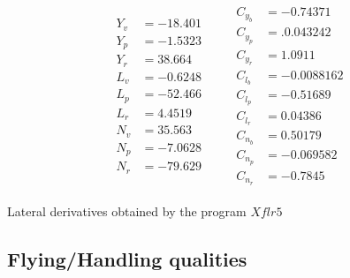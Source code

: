 \documentclass[english,fira]{ist-report}
\begin{document}
\begin{table}[ht]
    \centering
    \begin{gather*}
        \begin{aligned}
            Y_v &= -18.401 \\
            Y_p &= -1.5323 \\
            Y_r &=  38.664 \\
            L_v &= -0.6248 \\
            L_p &= -52.466 \\
            L_r &=  4.4519 \\
            N_v &=  35.563 \\
            N_p &= -7.0628 \\
            N_r &= -79.629
        \end{aligned}
        \qquad
        \begin{aligned}
            C_{y_b} &= -0.74371   \\
            C_{y_p} &= .0.043242  \\
            C_{y_r} &=  1.0911    \\
            C_{l_b} &= -0.0088162 \\
            C_{l_p} &= -0.51689   \\
            C_{l_r} &=  0.04386   \\
            C_{n_b} &=  0.50179   \\
            C_{n_p} &= -0.069582   \\
            C_{n_r} &= -0.7845
        \end{aligned}
    \end{gather*}
    \caption{Lateral derivatives obtained by the program $Xflr5$}
  \label{tab:lat_derivatives}
\end{table}


\subsection {Flying/Handling qualities}
\end{document}
